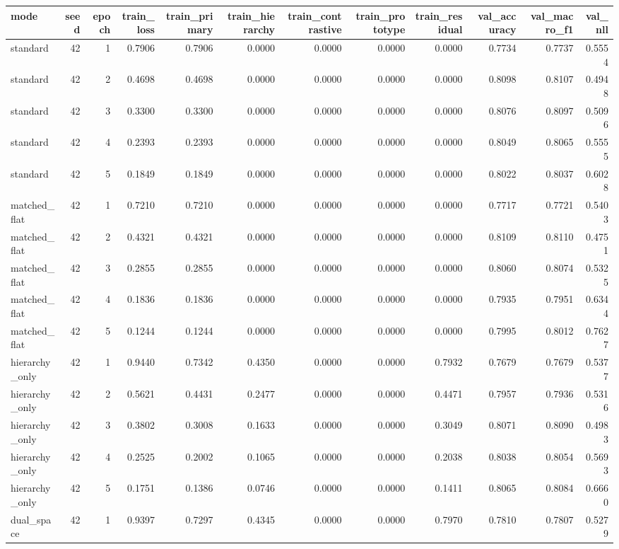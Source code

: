 \begin{tabular}{lrrrrrrrrrrr}
\toprule
mode & seed & epoch & train\_loss & train\_primary & train\_hierarchy & train\_contrastive & train\_prototype & train\_residual & val\_accuracy & val\_macro\_f1 & val\_nll \\
\midrule
standard & 42 & 1 & 0.7906 & 0.7906 & 0.0000 & 0.0000 & 0.0000 & 0.0000 & 0.7734 & 0.7737 & 0.5554 \\
standard & 42 & 2 & 0.4698 & 0.4698 & 0.0000 & 0.0000 & 0.0000 & 0.0000 & 0.8098 & 0.8107 & 0.4948 \\
standard & 42 & 3 & 0.3300 & 0.3300 & 0.0000 & 0.0000 & 0.0000 & 0.0000 & 0.8076 & 0.8097 & 0.5096 \\
standard & 42 & 4 & 0.2393 & 0.2393 & 0.0000 & 0.0000 & 0.0000 & 0.0000 & 0.8049 & 0.8065 & 0.5555 \\
standard & 42 & 5 & 0.1849 & 0.1849 & 0.0000 & 0.0000 & 0.0000 & 0.0000 & 0.8022 & 0.8037 & 0.6028 \\
matched\_flat & 42 & 1 & 0.7210 & 0.7210 & 0.0000 & 0.0000 & 0.0000 & 0.0000 & 0.7717 & 0.7721 & 0.5403 \\
matched\_flat & 42 & 2 & 0.4321 & 0.4321 & 0.0000 & 0.0000 & 0.0000 & 0.0000 & 0.8109 & 0.8110 & 0.4751 \\
matched\_flat & 42 & 3 & 0.2855 & 0.2855 & 0.0000 & 0.0000 & 0.0000 & 0.0000 & 0.8060 & 0.8074 & 0.5325 \\
matched\_flat & 42 & 4 & 0.1836 & 0.1836 & 0.0000 & 0.0000 & 0.0000 & 0.0000 & 0.7935 & 0.7951 & 0.6344 \\
matched\_flat & 42 & 5 & 0.1244 & 0.1244 & 0.0000 & 0.0000 & 0.0000 & 0.0000 & 0.7995 & 0.8012 & 0.7627 \\
hierarchy\_only & 42 & 1 & 0.9440 & 0.7342 & 0.4350 & 0.0000 & 0.0000 & 0.7932 & 0.7679 & 0.7679 & 0.5377 \\
hierarchy\_only & 42 & 2 & 0.5621 & 0.4431 & 0.2477 & 0.0000 & 0.0000 & 0.4471 & 0.7957 & 0.7936 & 0.5316 \\
hierarchy\_only & 42 & 3 & 0.3802 & 0.3008 & 0.1633 & 0.0000 & 0.0000 & 0.3049 & 0.8071 & 0.8090 & 0.4983 \\
hierarchy\_only & 42 & 4 & 0.2525 & 0.2002 & 0.1065 & 0.0000 & 0.0000 & 0.2038 & 0.8038 & 0.8054 & 0.5693 \\
hierarchy\_only & 42 & 5 & 0.1751 & 0.1386 & 0.0746 & 0.0000 & 0.0000 & 0.1411 & 0.8065 & 0.8084 & 0.6660 \\
dual\_space & 42 & 1 & 0.9397 & 0.7297 & 0.4345 & 0.0000 & 0.0000 & 0.7970 & 0.7810 & 0.7807 & 0.5279 \\

\end{tabular}

